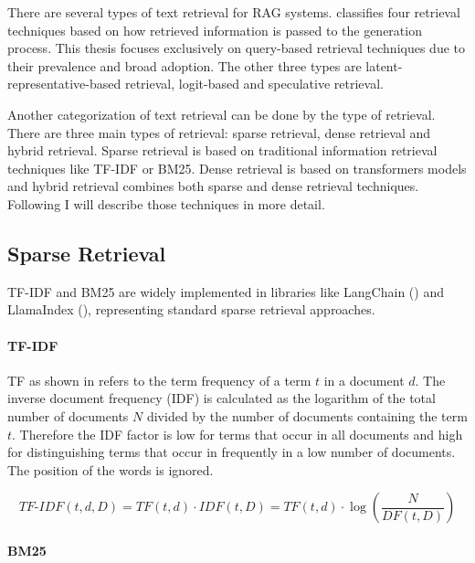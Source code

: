 
There are several types of text retrieval for RAG systems. \citet{Zhao.29.02.2024} classifies four retrieval techniques based on how retrieved information is passed to the generation process. This thesis focuses exclusively on query-based retrieval techniques due to their prevalence and broad adoption. The other three types are latent-representative-based retrieval, logit-based and speculative retrieval.

Another categorization of text retrieval can be done by the type of retrieval. There are three main types of retrieval: sparse retrieval, dense retrieval and hybrid retrieval. Sparse retrieval is based on traditional information retrieval techniques like TF-IDF or BM25. Dense retrieval is based on transformers models and hybrid retrieval combines both sparse and dense retrieval techniques. Following I  will describe those techniques in more detail.
\subsection{Sparse Retrieval}
\label{sec:sparse_retrieval}

TF-IDF and BM25 are widely implemented in libraries like LangChain (\citet{Chase_LangChain_2022}) and LlamaIndex (\citet{Liu_LlamaIndex_2022}), representing standard sparse retrieval approaches.

\paragraph{TF-IDF}
\label{sec:tfidf}

TF as shown in \citet{Manning.2009} refers to the term frequency of a term $t$ in a document $d$. The inverse document frequency (IDF) is calculated as the logarithm of the total number of documents $N$ divided by the number of documents containing the term $t$. Therefore the IDF factor is low for terms that occur in all documents and high for distinguishing terms that occur in frequently in a low number of documents. The position of the words is ignored.

$$\textit{TF-IDF}(t, d, D) = \textit{TF}(t, d) \cdot \textit{IDF}(t, D) = \textit{TF}(t, d) \cdot \log\left(\frac{N}{\textit{DF}(t, D)}\right)
$$

\paragraph{BM25}
\label{sec:bm25}

